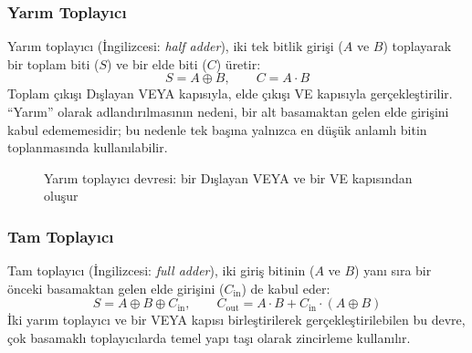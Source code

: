 \subsubsection{Yarım Toplayıcı}

Yarım toplayıcı (İngilizcesi: \textit{half adder}), iki tek bitlik girişi ($A$ ve $B$) toplayarak bir toplam biti ($S$) ve bir elde biti ($C$) üretir:
\[
S = A \oplus B, \qquad C = A \cdot B
\]
Toplam çıkışı Dışlayan VEYA kapısıyla, elde çıkışı VE kapısıyla gerçekleştirilir. ``Yarım'' olarak adlandırılmasının nedeni, bir alt basamaktan gelen elde girişini kabul edememesidir; bu nedenle tek başına yalnızca en düşük anlamlı bitin toplanmasında kullanılabilir.

\begin{figure}[H]
\centering
{}
\caption{Yarım toplayıcı devresi: bir Dışlayan VEYA ve bir VE kapısından oluşur}
\label{fig:B.yarim-toplayici}
\end{figure}

\subsubsection{Tam Toplayıcı}

Tam toplayıcı (İngilizcesi: \textit{full adder}), iki giriş bitinin ($A$ ve $B$) yanı sıra bir önceki basamaktan gelen elde girişini ($C_{\text{in}}$) de kabul eder:
\[
S = A \oplus B \oplus C_{\text{in}}, \qquad C_{\text{out}} = A \cdot B + C_{\text{in}} \cdot (A \oplus B)
\]
İki yarım toplayıcı ve bir VEYA kapısı birleştirilerek gerçekleştirilebilen bu devre, çok basamaklı toplayıcılarda temel yapı taşı olarak zincirleme kullanılır.

